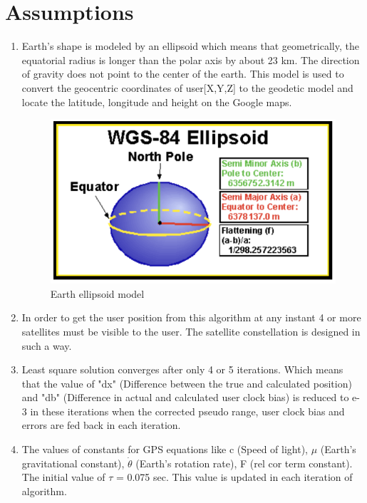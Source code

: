 \documentclass[conference,compsoc]{IEEEtran}
\begin{document}




\section{Assumptions}
\begin{enumerate}
\item Earth's shape is modeled by an ellipsoid which means that geometrically, the equatorial radius is longer than the
polar axis by about 23 km. The direction of gravity does not point to the center of the earth. This model is used to convert the geocentric coordinates of user[X,Y,Z] to the geodetic model and  locate the latitude, longitude and height on the Google maps.
\begin{figure}[h]
	\centering
	\includegraphics[scale = 0.5]{images/ellipse.png}
	\caption{Earth ellipsoid model\cite{I2}}
\end{figure}
\item In order to get the user position from this algorithm at any instant 4 or more satellites must be visible to the user. The satellite constellation is designed in such a way.
\item Least square solution converges after only 4 or 5 iterations. Which means that the value of "dx" (Difference between the true and calculated position) and "db" (Difference in actual and calculated user clock bias) is reduced to e-3 in these iterations when the corrected pseudo range, user clock bias and errors are fed back in each iteration.
\item The values of constants for GPS equations like c (Speed of light), $\mu$ (Earth's gravitational constant), $\dot{\theta}$ (Earth's rotation rate), F (rel cor term constant). The initial value of $\tau$ = 0.075 sec. This value is updated in each iteration of algorithm.
\end{enumerate}
\end{document}
